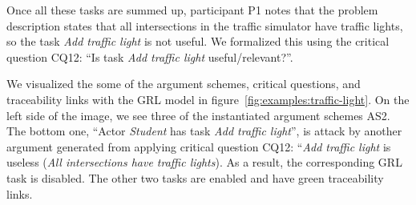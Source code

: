 Once all these tasks are summed up, participant P1 notes that the problem description states that all intersections in the traffic simulator have traffic lights, so the task \emph{Add traffic light} is not useful. We formalized this using the critical question CQ12: ``Is task \emph{Add traffic light} useful/relevant?''.

We visualized the some of the argument schemes, critical questions, and traceability links with the GRL model in figure~\ref{fig:examples:traffic-light}. On the left side of the image, we see three of the instantiated argument schemes AS2. The bottom one, ``Actor \emph{Student} has task \emph{Add traffic light}'', is attack by another argument generated from applying critical question CQ12: ``\emph{Add traffic light} is useless (\emph{All intersections have traffic lights}). As a result, the corresponding GRL task is disabled. The other two tasks are enabled and have green traceability links.

